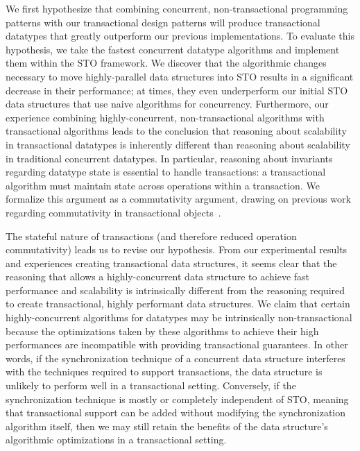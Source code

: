 We first hypothesize that combining concurrent, non-transactional programming patterns with our transactional design patterns will produce transactional datatypes that greatly outperform our previous implementations. To evaluate this hypothesis, we take the fastest concurrent datatype algorithms and implement them within the STO framework. We discover that the algorithmic changes necessary to move highly-parallel data structures into STO results in a significant decrease in their performance; at times, they even underperform our initial STO data structures that use naive algorithms for concurrency.
Furthermore, our experience combining highly-concurrent, non-transactional algorithms with transactional algorithms leads to the conclusion that reasoning about scalability in transactional datatypes is inherently different than reasoning about scalability in traditional concurrent datatypes. In particular, reasoning about invariants regarding datatype state is essential to handle transactions: a transactional algorithm must maintain state across operations within a transaction. We formalize this argument as a commutativity argument, drawing on previous work regarding commutativity in transactional objects~\cite{weihl}.

The stateful nature of transactions (and therefore reduced operation commutativity) leads us to revise our hypothesis. From our experimental results and experiences creating transactional data structures, it seems clear that the reasoning that allows a highly-concurrent data structure to achieve fast performance and scalability is intrinsically different from the reasoning required to create transactional, highly performant data structures. 
We claim that certain highly-concurrent algorithms for datatypes may be intrinsically non-transactional because the optimizations taken by these algorithms to achieve their high performances are incompatible with providing transactional guarantees. In other words, if the synchronization technique of a concurrent data structure interferes with the techniques required to support transactions, the data structure is unlikely to perform well in a transactional setting. Conversely, if the synchronization technique is mostly or completely independent of STO, meaning that transactional support can be added without modifying the synchronization algorithm itself, then we may still retain the benefits of the data structure's algorithmic optimizations in a transactional setting.

